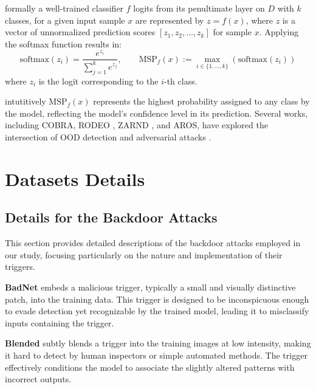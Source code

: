 formally a well-trained classifier \(f\) logits  from its penultimate layer on $D$ with \(k\) classes,  for a given input sample \(x\) are represented by \(z = f(x)\), where \(z\) is a vector of unnormalized prediction scores \([z_1, z_2, \dots, z_k]\) for sample $x$. Applying the softmax function results in:
$$\text{softmax}(z_i) = \frac{e^{z_i}}{\sum_{j=1}^k e^{z_j}}, \quad \quad {\text{MSP}}_{f}(x) :=   \max_{i \in \{1, \dots, k\}} (\text{softmax}(z_i))
 $$ where \(z_i\) is the logit corresponding to the \(i\)-th class.  
 
 intutitively ${\text{MSP}}_{f}(x)$ represents the highest probability assigned to any class by the model, reflecting the model's confidence level in its prediction.
Several works, including COBRA\cite{mirzaei2025mitigatingspuriousnegativepairs}, RODEO \cite{mirzaeirodeo}, ZARND \cite{mirzaei2024killing}, and AROS\cite{mirzaei2024adversarially}, have explored the intersection of OOD detection and adversarial attacks \cite{mirzaei2022fake,mirzaei2024universal,salehi2021unified,mirzaeiscanning,moakhar2023seeking,jafari2024power,taghavi2023change,rahimi-etal-2024-hallusafe,taghavi2023imaginations,taghavi-etal-2023-ebhaam,taghavi2024backdooring,ebrahimi2024sharifa,ebrahimi2024sharif,rahimi-etal-2024-nimz}.





\section{Datasets Details}
\label{app:datasets}

\subsection{Details for the Backdoor Attacks}
\label{app:backdoor-attacks}

This section provides detailed descriptions of the backdoor attacks employed in our study, focusing particularly on the nature and implementation of their triggers.

\textbf{BadNet} \cite{badnets} embeds a malicious trigger, typically a small and visually distinctive patch, into the training data. This trigger is designed to be inconspicuous enough to evade detection yet recognizable by the trained model, leading it to misclassify inputs containing the trigger.

\textbf{Blended} \cite{blended} subtly blends a trigger into the training images at low intensity, making it hard to detect by human inspectors or simple automated methods. The trigger effectively conditions the model to associate the slightly altered patterns with incorrect outputs.

